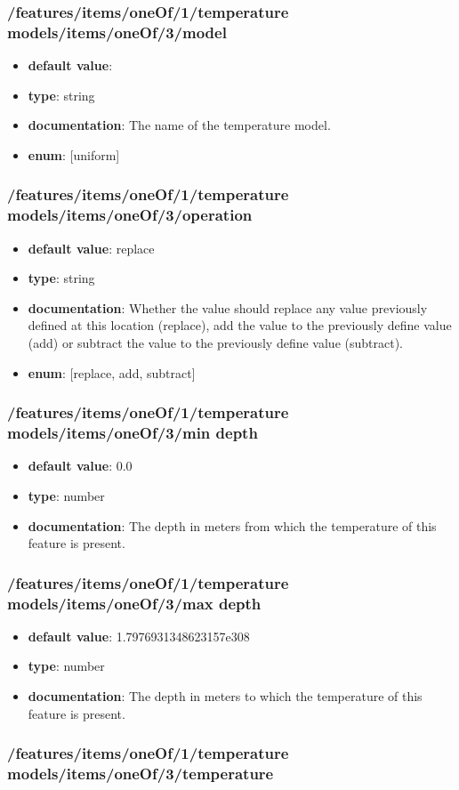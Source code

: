 \subsubsection{/features/items/oneOf/1/temperature models/items/oneOf/3/model}
\begin{itemize}\item {\bf default value}: 
\item {\bf type}: string
\item {\bf documentation}: The name of the temperature model.
\item {\bf enum}: [uniform]\end{itemize}\subsubsection{/features/items/oneOf/1/temperature models/items/oneOf/3/operation}
\begin{itemize}\item {\bf default value}: replace
\item {\bf type}: string
\item {\bf documentation}: Whether the value should replace any value previously defined at this location (replace), add the value to the previously define value (add) or subtract the value to the previously define value (subtract).
\item {\bf enum}: [replace, add, subtract]\end{itemize}\subsubsection{/features/items/oneOf/1/temperature models/items/oneOf/3/min depth}
\begin{itemize}\item {\bf default value}: 0.0
\item {\bf type}: number
\item {\bf documentation}: The depth in meters from which the temperature of this feature is present.
\end{itemize}\subsubsection{/features/items/oneOf/1/temperature models/items/oneOf/3/max depth}
\begin{itemize}\item {\bf default value}: 1.7976931348623157e308
\item {\bf type}: number
\item {\bf documentation}: The depth in meters to which the temperature of this feature is present.
\end{itemize}\subsubsection{/features/items/oneOf/1/temperature models/items/oneOf/3/temperature}
